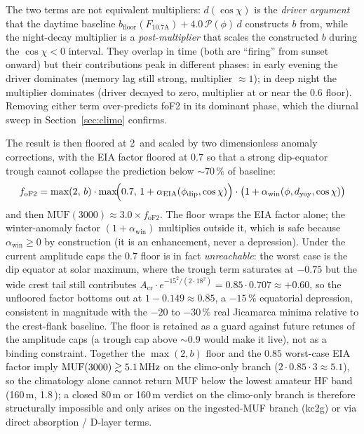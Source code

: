 \documentclass[11pt,a4paper]{article}
\newcommand{\SI}[2]{#1\,\text{#2}}
\newcommand{\MHz}{\text{MHz}}
\begin{document}
The two terms are not equivalent multipliers: $d(\cos\chi)$ is the
\emph{driver argument} that the daytime baseline
$b_{\text{floor}}(F_{10.7\text{A}}) + 4.0\,\mathcal{P}(\phi)\,d$
constructs $b$ from, while the night-decay multiplier is a
\emph{post-multiplier} that scales the constructed $b$ during the
$\cos\chi < 0$ interval.  They overlap in time (both are
``firing'' from sunset onward) but their contributions peak in
different phases: in early evening the driver dominates (memory
lag still strong, multiplier $\approx 1$); in deep night the
multiplier dominates (driver decayed to zero, multiplier at or
near the $0.6$ floor).  Removing either term over-predicts
foF2 in its dominant phase, which the diurnal sweep in
Section~\ref{sec:climo} confirms.

The result is then floored at \SI{2}{\MHz} and scaled by two
dimensionless anomaly corrections, with the EIA factor floored at
$0.7$ so that a strong dip-equator trough cannot
collapse the prediction below ${\sim}70\,\%$ of baseline:
\begin{equation}\label{eq:fof2}
  f_{\text{oF2}} = \max(2,\,b)\cdot
    \max\!\Bigl(0.7,\,
      1 + \alpha_{\text{EIA}}(\phi_{\text{dip}}, \cos\chi)\Bigr) \cdot
      \bigl(1 + \alpha_{\text{win}}(\phi, d_{\text{yoy}}, \cos\chi)\bigr)
\end{equation}
and then $\text{MUF}(3000) \approx 3.0 \times f_{\text{oF2}}$.
The floor wraps the EIA factor alone; the winter-anomaly factor
$(1 + \alpha_{\text{win}})$ multiplies outside it, which is safe
because $\alpha_{\text{win}} \geq 0$ by construction (it is an
enhancement, never a depression).  Under the current amplitude
caps the $0.7$ floor is in fact \emph{unreachable}: the worst
case is the dip equator at solar maximum, where the trough term
saturates at $-0.75$ but the wide crest tail still contributes
$A_{\text{cr}} \cdot e^{-15^2/(2 \cdot 18^2)} = 0.85 \cdot 0.707
\approx +0.60$, so the unfloored factor bottoms out at $1 -
0.149 \approx 0.85$, a $-15\,\%$ equatorial depression,
consistent in magnitude with the $-20$ to $-30\,\%$ real
Jicamarca minima relative to the crest-flank baseline.  The
floor is retained as a guard against future retunes of the
amplitude caps (a trough cap above ${\sim}0.9$ would make it
live), not as a binding constraint.  Together the $\max(2, b)$
floor and the $0.85$ worst-case EIA factor imply
$\text{MUF}(3000) \gtrsim \SI{5.1}{\MHz}$ on the climo-only
branch ($2 \cdot 0.85 \cdot 3 \approx 5.1$), so the climatology
alone cannot return MUF below the lowest amateur HF band
(160\,m, \SI{1.8}{\MHz}); a closed 80\,m or 160\,m verdict on
the climo-only branch is therefore structurally impossible and
only arises on the ingested-MUF branch (kc2g) or via direct
absorption / D-layer terms.
\end{document}
